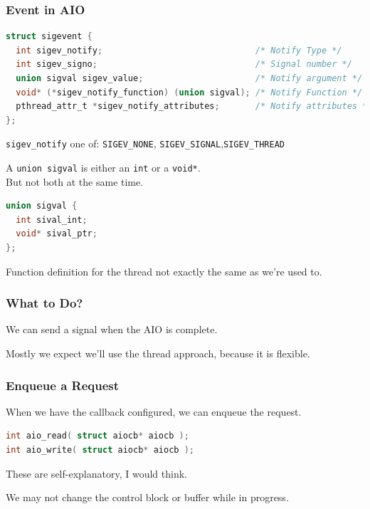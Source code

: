 \begin{frame}[fragile]
\frametitle{Event in AIO}

\begin{lstlisting}[language=C]
struct sigevent {
  int sigev_notify;                              /* Notify Type */
  int sigev_signo;                               /* Signal number */
  union sigval sigev_value;                      /* Notify argument */
  void* (*sigev_notify_function) (union sigval); /* Notify Function */
  pthread_attr_t *sigev_notify_attributes;       /* Notify attributes */
};
\end{lstlisting}

\texttt{sigev\_notify} one of: \texttt{SIGEV\_NONE}, \texttt{SIGEV\_SIGNAL},\texttt{SIGEV\_THREAD}

A \texttt{union sigval} is either an \texttt{int} or a \texttt{void*}.\\
\quad But not both at the same time.

\begin{lstlisting}[language=C]
union sigval {
  int sival_int;
  void* sival_ptr;
};
\end{lstlisting}

Function definition for the thread not exactly the same as we're used to.

\end{frame}


\begin{frame}
\frametitle{What to Do?}

We can send a signal when the AIO is complete.

Mostly we expect we'll use the thread approach, because it is flexible.


\end{frame}


\begin{frame}[fragile]
\frametitle{Enqueue a Request}

When we have the callback configured, we can enqueue the request.

\begin{lstlisting}[language=C]
int aio_read( struct aiocb* aiocb );
int aio_write( struct aiocb* aiocb );
\end{lstlisting}

These are self-explanatory, I would think.

We may not change the control block or buffer while in progress.

\end{frame}


